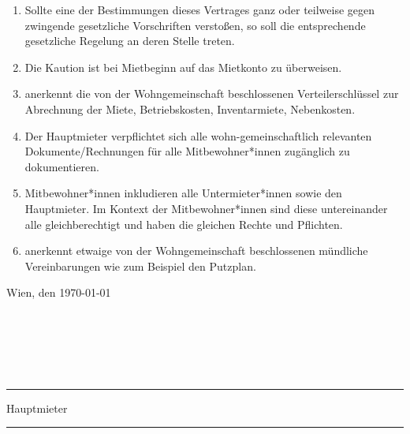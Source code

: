 \documentclass{scrreprt}[12pt,a4paper,twoside,duplex]
\newcommand{\vertragsschlussDatum}{\today}
\newcommand{\vertragsschlussOrt}{Wien}
\begin{document}
\begin{contract}
\label{clause:verinbarungen}
\begin{enumerate}
	\item Sollte eine der Bestimmungen dieses Vertrages ganz oder teilweise gegen zwingende gesetzliche Vorschriften versto{\ss}en, so soll die entsprechende gesetzliche Regelung an deren Stelle treten.

	\item Die Kaution ist bei Mietbeginn auf das Mietkonto zu überweisen.

	\item {} anerkennt die von der Wohngemeinschaft beschlossenen Verteilerschlüssel zur Abrechnung der Miete, Betriebskosten, Inventarmiete, Nebenkosten.
	
	\item Der Hauptmieter verpflichtet sich alle wohn-gemeinschaftlich relevanten Dokumente/Rechnungen für alle Mitbewohner*innen zugänglich zu dokumentieren.
	
	\item Mitbewohner*innen inkludieren alle Untermieter*innen sowie den Hauptmieter. Im Kontext der Mitbewohner*innen sind diese untereinander alle gleichberechtigt und haben die gleichen Rechte und Pflichten.
	
	\item {} anerkennt etwaige von der Wohngemeinschaft
	beschlossenen mündliche Vereinbarungen wie zum Beispiel den Putzplan.
\end{enumerate}
\end{contract}

\vspace{1cm}
\vertragsschlussOrt, den \vertragsschlussDatum \\ \\ \\ \\  \\ \\
\begin{minipage}[tl]{0.4\textwidth}
	\flushleft
	\hrule\vspace{1ex} Hauptmieter
\end{minipage}
\hspace{0.2\textwidth}
\begin{minipage}[tr]{0.4\textwidth}
	\flushleft
	\hrule\vspace{1ex} 
\end{minipage}
\end{document}
